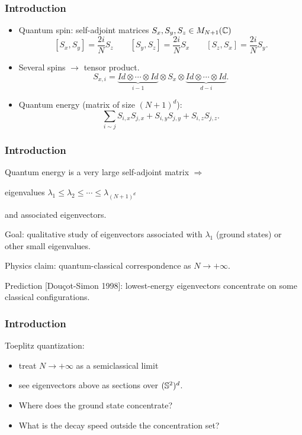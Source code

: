 \documentclass[mathserif]{beamer}
\newcommand{\mycite}[1]{{\color{mygreen} \small #1}}
\begin{document}
     \begin{frame}\frametitle{Introduction}
       \begin{itemize}
       \item Quantum spin: self-adjoint matrices
         $S_x,S_y,S_z\in M_{N+1}(\C)$ \[[S_x,S_y]=\frac{2i}{N}S_z\qquad
           [S_y,S_z]=\frac{2i}{N}S_x\qquad [S_z,S_x]=\frac{2i}{N}S_y.\]
       \item Several spins $\rightarrow$ {\color{myorange} tensor product}.
         \[S_{x,i}=\underbrace{Id\otimes \cdots\otimes Id}_{i-1}\otimes S_x\otimes
           \underbrace{Id\otimes
             \cdots
             \otimes
             Id}_{d-i}.\]
         
       \item<2>
         Quantum
         energy
         (matrix
         of
         size
         $(N+1)^d$):
         \[
           \sum_{i\sim j}S_{i,x}S_{j,x}+S_{i,y}S_{j,y}+S_{i,z}S_{j,z}.\]
         
         
      \end{itemize}
    \end{frame}
    \begin{frame}
      \frametitle{Introduction}
      Quantum energy is a {\color{myorange}very large} self-adjoint matrix $\Rightarrow$
      
      \hspace{1em}eigenvalues
      $\lambda_1\leq \lambda_2\leq \cdots\leq \lambda_{(N+1)^d}$

      \hspace{1em}and associated eigenvectors. \vspace{1em}
      
      Goal: {\color{myorange} qualitative study of eigenvectors} associated with
      $\lambda_1$ (ground states) or other small eigenvalues.
      
      \hfill
      
      Physics claim: {\color{myorange} quantum-classical
          correspondence} as $N\to +\infty$.
        
        \hfill
        
      Prediction \mycite{[Douçot-Simon 1998]}: lowest-energy eigenvectors concentrate on {\color{myorange} some} classical configurations.
    \end{frame}
      \begin{frame}
        \frametitle{Introduction}
        Toeplitz quantization:
        \begin{itemize}
          \item treat $N\to +\infty$ as a semiclassical
       limit
     \item see eigenvectors above as sections over $(\S^2)^d$.
     \end{itemize}
     \begin{itemize}
        \item<2-> Where does the ground state concentrate?
        \item<3> What is the decay speed outside the concentration set?
        \end{itemize}
      \end{frame}
\end{document}
